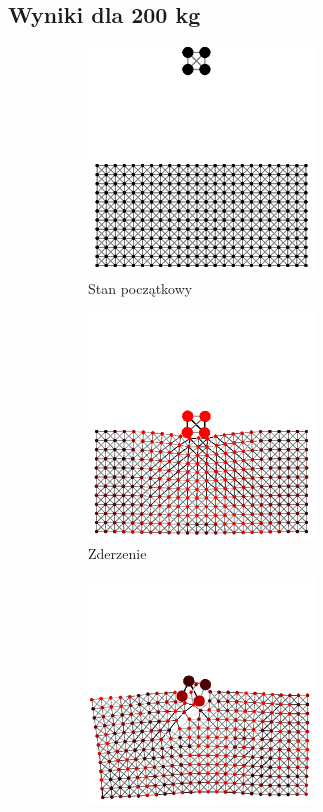\documentclass[12pt, letterpaper]{report}
\begin{document}
    \subsection{Wyniki dla 200 kg}
    \begin{figure}[h]

        \begin{subfigure}{0.5\textwidth}
            \centering
            \includegraphics[width=6cm, height=6cm]{collision_2x2_24x12_mass50_1} 
            \caption{Stan początkowy}
        \end{subfigure}
        \begin{subfigure}{0.5\textwidth}
            \centering
            \includegraphics[width=6cm, height=6cm]{collision_2x2_24x12_mass50_2}
            \caption{Zderzenie}
        \end{subfigure}
        \begin{subfigure}{0.5\textwidth}
            \centering
            \includegraphics[width=6cm, height=6cm]{collision_2x2_24x12_mass50_3}

\end{subfigure}
\end{figure}
\end{document}
